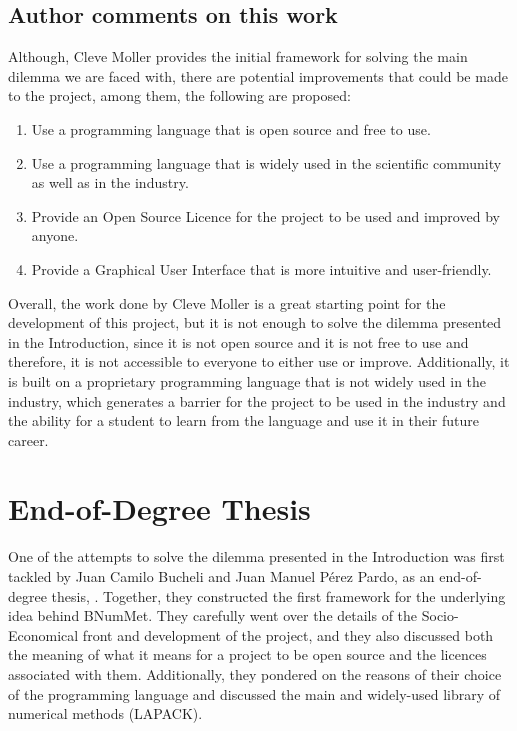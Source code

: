 \subsection{Author comments on this work}
Although, Cleve Moller provides the initial framework for solving the main dilemma we are faced with, there are potential improvements that could be made to the project, among them, the following are proposed:

\begin{enumerate}
    \item Use a programming language that is open source and free to use.
    \item Use a programming language that is widely used in the scientific community as well as in the industry.
    \item Provide an Open Source Licence for the project to be used and improved by anyone.
    \item Provide a Graphical User Interface that is more intuitive and user-friendly.
\end{enumerate}


Overall, the work done by Cleve Moller is a great starting point for the development of this project, but it is not enough to solve the dilemma presented in the Introduction, since it is not open source and it is not free to use and therefore, it is not accessible to everyone to either use or improve. Additionally, it is built on a proprietary programming language that is not widely used in the industry, which generates a barrier for the project to be used in the industry and the ability for a student to learn from the language and use it in their future career.


\section{End-of-Degree Thesis}
One of the attempts to solve the dilemma presented in the Introduction was first tackled by Juan Camilo Bucheli and Juan Manuel Pérez Pardo, as an end-of-degree thesis, \cite{bucheli2020}. Together, they constructed the first framework for the underlying idea behind BNumMet.
They carefully went over the details of the Socio-Economical front and development of the project, and they also discussed both the meaning of what it means for a project to be open source and the licences associated with them. Additionally, they pondered on the reasons of their choice of the programming language and discussed the main and widely-used library of numerical methods (LAPACK).

